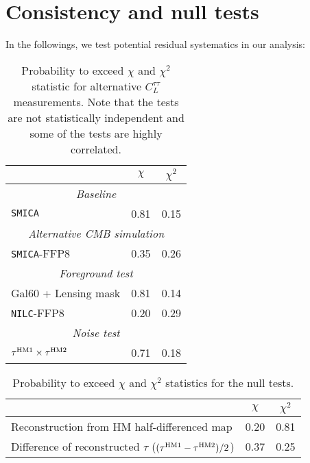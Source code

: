 \documentclass[aps,prd,twocolumn,superscriptaddress,groupedaddress,nofootinbib]{revtex4}
\def\SMICA{{\tt SMICA}}
\def\NILC{{\tt NILC}}
\begin{document}
\section{Consistency and null tests} \label{discuss}

In the followings, we test potential residual systematics in our analysis:

\begin{table}
\centering
\caption{
Probability to exceed $\chi$ and $\chi^2$ statistic for alternative $C_L^{\tau\tau}$ measurements.
Note that the tests are not statistically independent and some of the tests are highly correlated. 
}
\label{table:PTE}
\begin{tabular}{lcc} \hline
 & $\chi$ & $\chi^2$ \\ \hline
\multicolumn{3}{c}{\it Baseline} \\
\SMICA & 0.81 & 0.15 \\
\multicolumn{3}{c}{\it Alternative CMB simulation} \\
\SMICA-FFP8 & 0.35 & 0.26 \\
\multicolumn{3}{c}{\it Foreground test} \\
Gal60 + Lensing mask   & 0.81 & 0.14 \\
\NILC-FFP8 & 0.20 & 0.29 \\
\multicolumn{3}{c}{\it Noise test} \\
$\tau^{\rm HM1}\times\tau^{\rm HM2}$ & 0.71 & 0.18 \\
\hline
\end{tabular}
\end{table}

\begin{table}
\centering
\caption{
Probability to exceed $\chi$ and $\chi^2$ statistics for the null tests.
}
\label{table:PTE:null}
\begin{tabular}{lcc} \hline
 & $\chi$ & $\chi^2$ \\ \hline
Reconstruction from HM half-differenced map & 0.20 & 0.81 \\
Difference of reconstructed $\tau$ ($(\tau^{\rm HM1}-\tau^{\rm HM2})/2$) & 0.37 & 0.25 \\ 
\hline
\end{tabular}
\end{table}
\end{document}
